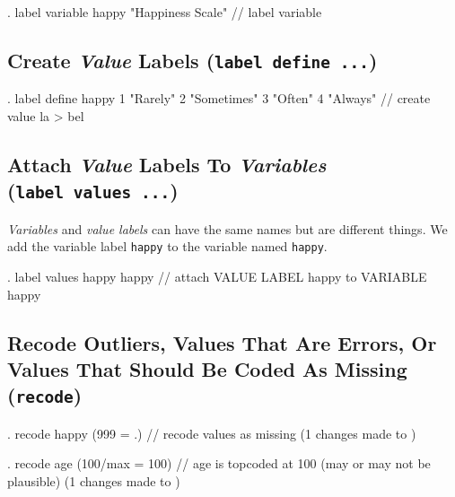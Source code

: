 \documentclass[
]{article}
\begin{document}
\begin{stlog}
. label variable happy "Happiness Scale" // label variable
\end{stlog}

\subsection{\texorpdfstring{Create \emph{Value} Labels
(\texttt{label\ define\ ...})}{Create Value Labels (label define ...)}}\label{create-value-labels-label-define-...}

\begin{stlog}
. label define happy 1 "Rarely" 2 "Sometimes" 3 "Often" 4 "Always" // create value la
> bel
\end{stlog}

\subsection{\texorpdfstring{Attach \emph{Value} Labels To
\emph{Variables}
(\texttt{label\ values\ ...})}{Attach Value Labels To Variables (label values ...)}}\label{attach-value-labels-to-variables-label-values-...}

\emph{Variables} and \emph{value labels} can have the same names but are
different things. We add the variable label \texttt{happy} to the
variable named \texttt{happy}.

\begin{stlog}
. label values happy happy // attach VALUE LABEL happy to VARIABLE happy
\end{stlog}

\subsection{\texorpdfstring{Recode Outliers, Values That Are Errors, Or
Values That Should Be Coded As Missing
(\texttt{recode})}{Recode Outliers, Values That Are Errors, Or Values That Should Be Coded As Missing (recode)}}\label{recode-outliers-values-that-are-errors-or-values-that-should-be-coded-as-missing-recode}

\begin{stlog}
. recode happy (999 = .) // recode values as missing
(1 changes made to {})
\end{stlog}

\begin{stlog}
. recode age (100/max = 100) // age is topcoded at 100 (may or may not be plausible)
(1 changes made to {})
\end{stlog}
\end{document}
